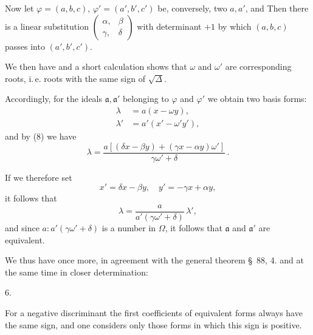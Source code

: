 

Now let $\varphi = (a, b, c)$, $\varphi' = (a', b', c')$ be, conversely, two
 $a, a'$, and
Then there is a linear substitution $\begin{pmatrix} \alpha, & \beta \\ \gamma, & \delta \end{pmatrix}$ with determinant $+1$ by which $(a, b, c)$ passes into $(a', b', c')$.

We then have
and a short calculation shows that $\omega$ and $\omega'$ are corresponding roots, i.\,e. roots with the same sign of $\sqrt{\Delta}$.

Accordingly, for the ideals $\mathfrak{a}, \mathfrak{a}'$ belonging to $\varphi$ and $\varphi'$ we obtain two basis forms:
\[
\begin{aligned}
\lambda &= a(x - \omega y),\\
\lambda' &= a'(x' - \omega'y'),
\end{aligned}
\]
and by (8) we have
\[
\lambda = \frac{a[(\delta x - \beta y) + (\gamma x - \alpha y)\omega']}{\gamma\omega' + \delta}\,.
\]

If we therefore set
\[
x' = \delta x - \beta y, \quad y' = -\gamma x + \alpha y,
\]
it follows that
\[
\lambda = \frac{a}{a'(\gamma\omega' + \delta)}\,\lambda',
\]
and since $a : a'(\gamma\omega' + \delta)$ is a number in $\Omega$, it follows that $\mathfrak{a}$ and $\mathfrak{a}'$ are equivalent.

We thus have once more, in agreement with the general theorem \S\ 88, 4. and at the same time in closer determination:

6. 

For a negative discriminant the first coefficients of equivalent forms always have the same sign, and one considers only those forms in which this sign is positive.
